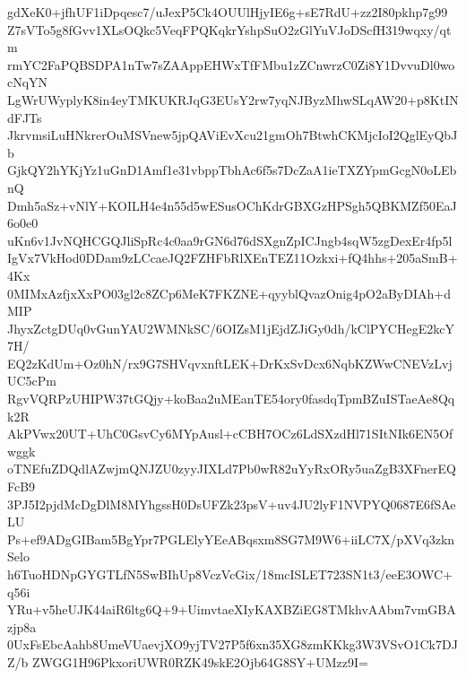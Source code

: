 gdXeK0+jfhUF1iDpqesc7/uJexP5Ck4OUUlHjyIE6g+sE7RdU+zz2I80pkhp7g99
Z7sVTo5g8fGvv1XLsOQkc5VeqFPQKqkrYshpSuO2zGlYuVJoDScfH319wqxy/qtm
rmYC2FaPQBSDPA1nTw7sZAAppEHWxTfFMbu1zZCnwrzC0Zi8Y1DvvuDl0wocNqYN
LgWrUWyplyK8in4eyTMKUKRJqG3EUsY2rw7yqNJByzMhwSLqAW20+p8KtINdFJTs
JkrvmsiLuHNkrerOuMSVnew5jpQAViEvXcu21gmOh7BtwhCKMjcIoI2QglEyQbJb
GjkQY2hYKjYz1uGnD1Amf1e31vbppTbhAc6f5s7DcZaA1ieTXZYpmGcgN0oLEbnQ
Dmh5aSz+vNlY+KOILH4e4n55d5wESusOChKdrGBXGzHPSgh5QBKMZf50EaJ6o0e0
uKn6v1JvNQHCGQJliSpRc4c0aa9rGN6d76dSXgnZpICJngb4sqW5zgDexEr4fp5l
IgVx7VkHod0DDam9zLCcaeJQ2FZHFbRlXEnTEZ11Ozkxi+fQ4hhs+205aSmB+4Kx
0MIMxAzfjxXxPO03gl2c8ZCp6MeK7FKZNE+qyyblQvazOnig4pO2aByDIAh+dMIP
JhyxZctgDUq0vGunYAU2WMNkSC/6OIZsM1jEjdZJiGy0dh/kClPYCHegE2kcY7H/
EQ2zKdUm+Oz0hN/rx9G7SHVqvxnftLEK+DrKxSvDcx6NqbKZWwCNEVzLvjUC5cPm
RgvVQRPzUHIPW37tGQjy+koBaa2uMEanTE54ory0fasdqTpmBZuISTaeAe8Qqk2R
AkPVwx20UT+UhC0GsvCy6MYpAusl+cCBH7OCz6LdSXzdHl71SItNIk6EN5Ofwggk
oTNEfuZDQdlAZwjmQNJZU0zyyJIXLd7Pb0wR82uYyRxORy5uaZgB3XFnerEQFcB9
3PJ5I2pjdMcDgDlM8MYhgssH0DsUFZk23psV+uv4JU2lyF1NVPYQ0687E6fSAeLU
Ps+ef9ADgGIBam5BgYpr7PGLElyYEeABqsxm8SG7M9W6+iiLC7X/pXVq3zknSelo
h6TuoHDNpGYGTLfN5SwBIhUp8VczVcGix/18mcISLET723SN1t3/eeE3OWC+q56i
YRu+v5heUJK44aiR6ltg6Q+9+UimvtaeXIyKAXBZiEG8TMkhvAAbm7vmGBAzjp8a
0UxFsEbcAahb8UmeVUaevjXO9yjTV27P5f6xn35XG8zmKKkg3W3VSvO1Ck7DJZ/b
ZWGG1H96PkxoriUWR0RZK49skE2Ojb64G8SY+UMzz9I=
